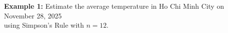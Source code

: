 \documentclass[preview]{standalone}
\begin{document}
\begin{center}
\textbf{Example 1:} Estimate the average temperature in Ho Chi Minh City on November 28, 2025\\using Simpson's Rule with $n=12$.
\end{center}
\end{document}
